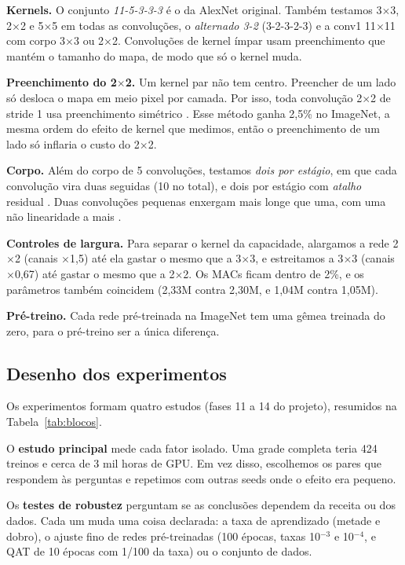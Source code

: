 \documentclass[conference]{IEEEtran}
\newcommand{\by}{\ensuremath{\times}}
\begin{document}
\textbf{Kernels.} O conjunto \textit{11-5-3-3-3} é o da AlexNet original. Também testamos 3\by3, 2\by2 e 5\by5 em todas as convoluções, o \textit{alternado 3-2} (3-2-3-2-3) e a conv1 11\by11 com
corpo 3\by3 ou 2\by2. Convoluções de kernel ímpar usam preenchimento que mantém o tamanho do mapa, de modo que só o kernel muda.

\textbf{Preenchimento do 2\by2.} Um kernel par não tem centro. Preencher de um lado só desloca o mapa em meio pixel por camada. Por isso, toda convolução 2\by2 de stride 1 usa preenchimento
simétrico \cite{wu2019convolution}. Esse método ganha 2,5\% no ImageNet, a mesma ordem do efeito de kernel que medimos, então o preenchimento de um lado só inflaria o custo do 2\by2.

\textbf{Corpo.} Além do corpo de 5 convoluções, testamos \textit{dois por estágio}, em que cada convolução vira duas seguidas (10 no total), e dois por estágio com \textit{atalho} residual
\cite{he2016deep}. Duas convoluções pequenas enxergam mais longe que uma, com uma não linearidade a mais \cite{simonyan2015very}.

\textbf{Controles de largura.} Para separar o kernel da capacidade, alargamos a rede 2\by2 (canais \by1,5) até ela gastar o mesmo que a 3\by3, e estreitamos a 3\by3 (canais \by0,67) até gastar o
mesmo que a 2\by2. Os MACs ficam dentro de 2\%, e os parâmetros também coincidem (2,33M contra 2,30M, e 1,04M contra 1,05M).

\textbf{Pré-treino.} Cada rede pré-treinada na ImageNet tem uma gêmea treinada do zero, para o pré-treino ser a única diferença.

\subsection{Desenho dos experimentos}

Os experimentos formam quatro estudos (fases 11 a 14 do projeto), resumidos na Tabela~\ref{tab:blocos}.

O \textbf{estudo principal} mede cada fator isolado. Uma grade completa teria 424 treinos e cerca de 3 mil horas de GPU. Em vez disso, escolhemos os pares que respondem às perguntas e repetimos com
outras seeds onde o efeito era pequeno.

Os \textbf{testes de robustez} perguntam se as conclusões dependem da receita ou dos dados. Cada um muda uma coisa declarada: a taxa de aprendizado (metade e dobro), o ajuste fino de redes
pré-treinadas (100 épocas, taxas 10$^{-3}$ e 10$^{-4}$, e QAT de 10 épocas com 1/100 da taxa) \cite{li2020rethinking} ou o conjunto de dados.
\end{document}
